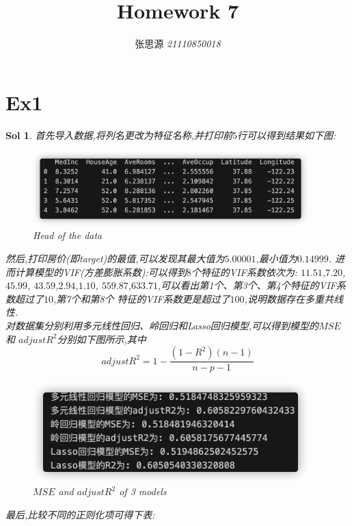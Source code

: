 \label{key}\documentclass[UTF8,a4paper,11pt]{ctexart}
\title{\textbf{Homework 7}}
\author{ 张思源  \qquad  \textit{21110850018} }   %
\newtheorem{sol}{Sol}[section]
\begin{document}
\maketitle
\section{Ex1}
\begin{sol}
	首先导入数据,将列名更改为特征名称,并打印前$5$行可以得到结果如下图:
	\begin{figure}[H]
		\centering
		\includegraphics[width=0.95\textwidth,height=0.6\textwidth]{head.png}
		\caption{Head of the data}
	\end{figure}
	然后,打印房价(即target)的最值,可以发现其最大值为$5.00001$,最小值为$0.14999$.
	进而计算模型的VIF(方差膨胀系数):可以得到$8$个特征的VIF系数依次为:
	$11.51$,$7.20$,$45.99$,
	$43.59$,$2.94$,$1.10$, 
	$559.87$,$633.71$,可以看出第1个、第3个、第4个特征的VIF系数超过了$10$,第7个和第8个
	特征的VIF系数更是超过了$100$,说明数据存在多重共线性.\\

	对数据集分别利用多元线性回归、岭回归和Lasso回归模型,可以得到模型的$MSE$和
	$adjustR^{2}$分别如下图所示,其中
	$$adjustR^{2}=1-\frac{(1-R^{2})(n-1)}{n-p-1}$$
	\begin{figure}[H]
		\centering
		\includegraphics[width=0.95\textwidth,height=0.6\textwidth]{model.png}
		\caption{$MSE$ and $adjustR^{2}$ of 3 models}
	\end{figure}
	最后,比较不同的正则化项可得下表:
	\begin{center}
		\begin{tabular}{c p{5cm} p{5cm}}
		

\end{tabular}
\end{center}
\end{sol}
\end{document}
